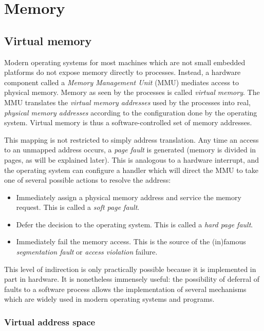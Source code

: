 \section{Memory}

\subsection{Virtual memory}

Modern operating systems for most machines which are not small embedded
platforms do not expose memory directly to processes.  Instead, a hardware
component called a \textit{Memory Management Unit} (MMU) mediates access to
physical memory.  Memory as seen by the processes is called \textit{virtual
memory}.  The MMU translates the \textit{virtual memory addresses} used by the
processes into real, \textit{physical memory addresses} according to the
configuration done by the operating system.  Virtual memory is thus a
software-controlled set of memory addresses.

This mapping is not restricted to simply address translation.  Any time an
access to an unmapped address occurs, a \textit{page fault} is generated (memory
is divided in pages, as will be explained later).  This is analogous to a
hardware interrupt, and the operating system can configure a handler which will
direct the MMU to take one of several possible actions to resolve the address:

\begin{itemize}
    \item
        Immediately assign a physical memory address and service the memory
        request.  This is called a \textit{soft page fault}.
    \item
        Defer the decision to the operating system.  This is called a
        \textit{hard page fault}.
    \item
        Immediately fail the memory access.  This is the source of the
        (in)famous \textit{segmentation fault} or \textit{access violation}
        failure.
\end{itemize}

This level of indirection is only practically possible because it is implemented
in part in hardware.  It is nonetheless immensely useful: the possibility of
deferral of faults to a software process allows the implementation of several
mechanisms which are widely used in modern operating systems and programs.

\subsubsection{Virtual address space}

